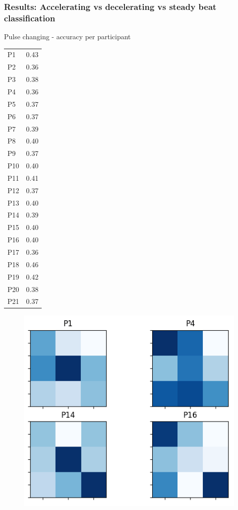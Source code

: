 \documentclass{beamer}
\begin{document}
\begin{frame}
	\frametitle{Results: Accelerating vs decelerating vs steady beat classification}

	\begin{multicols}{2}
		Pulse changing - accuracy per participant
		\begin{tabular}{l|l}
			P1 & 0.43 \\
			P2 & 0.36 \\
			P3 & 0.38 \\
			P4 & 0.36 \\
			P5 & 0.37 \\
			P6 & 0.37 \\
			P7 & 0.39 \\
			P8 & 0.40 \\
			P9 & 0.37 \\
			P10 & 0.40 \\
			P11 & 0.41 \\
			P12 & 0.37 \\
			P13 & 0.40 \\
			P14 & 0.39 \\
			P15 & 0.40 \\
			P16 & 0.40 \\
			P17 & 0.36 \\
			P18 & 0.46 \\
			P19 & 0.42 \\
			P20 & 0.38 \\
			P21 & 0.37 \\
		\end{tabular}
		\columnbreak
		\begin{figure}
			\centering
			\includegraphics[scale=1.0]{fig16.png}
		\end{figure}

	\end{multicols}

\end{frame}
\end{document}
